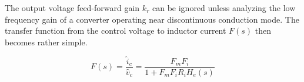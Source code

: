 \documentclass{tufte-handout}
\begin{document}
The output voltage feed-forward gain $k_r$ can be ignored unless analyzing the low frequency gain of a converter operating near discontinuous conduction mode. The transfer function from the control voltage to inductor current $F(s)$ then becomes rather simple.

$$F(s)=\frac{\widehat{i}_c}{\widehat{v}_c}=\frac{F_mF_i}{1+F_mF_iR_iH_e(s)}$$
\end{document}
